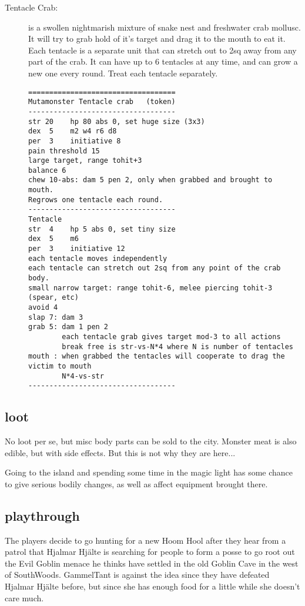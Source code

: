 \begin{description}
\item[Tentacle Crab:] is a swollen nightmarish mixture of snake nest and freshwater crab mollusc. It will try to grab hold of it's target and drag it to the mouth to eat it. Each tentacle is a separate unit that can stretch out to 2sq away from any part of the crab. It can have up to 6 tentacles at any time, and can grow a new one every round. Treat each tentacle separately.
\goodbreak \begin{samepage} \small \begin{verbatim}
===================================
Mutamonster Tentacle crab   (token)
-----------------------------------
str 20    hp 80 abs 0, set huge size (3x3)
dex  5    m2 w4 r6 d8
per  3    initiative 8
pain threshold 15
large target, range tohit+3
balance 6
chew 10-abs: dam 5 pen 2, only when grabbed and brought to mouth.
Regrows one tentacle each round.
-----------------------------------
Tentacle
str  4    hp 5 abs 0, set tiny size
dex  5    m6
per  3    initiative 12
each tentacle moves independently
each tentacle can stretch out 2sq from any point of the crab body.
small narrow target: range tohit-6, melee piercing tohit-3 (spear, etc)
avoid 4
slap 7: dam 3
grab 5: dam 1 pen 2
        each tentacle grab gives target mod-3 to all actions
        break free is str-vs-N*4 where N is number of tentacles
mouth : when grabbed the tentacles will cooperate to drag the victim to mouth
        N*4-vs-str
-----------------------------------
\end{verbatim} \normalsize \end{samepage}

\end{description}


\subsection*{loot}

No loot per se, but misc body parts can be sold to the city. Monster meat is also edible, but with side effects. But this is not why they are here...

Going to the island and spending some time in the magic light has some chance to give serious bodily changes, as well as affect equipment brought there.


\subsection*{playthrough}

The players decide to go hunting for a new Hoom Hool after they hear from a patrol that Hjalmar Hjälte is searching for people to form a posse to go root out the Evil Goblin menace he thinks have settled in the old Goblin Cave in the west of SouthWoods. GammelTant is against the idea since they have defeated Hjalmar Hjälte before, but since she has enough food for a little while she doesn't care much.

